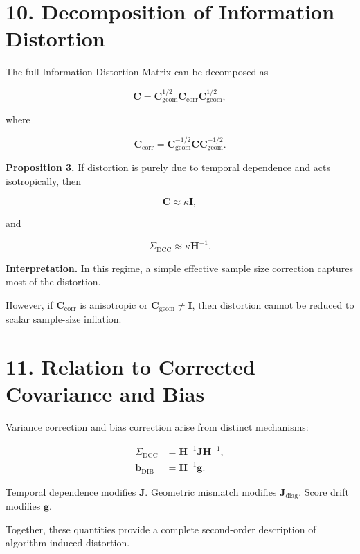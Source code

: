 \documentclass[11pt]{article}
\begin{document}
\section*{10. Decomposition of Information Distortion}

The full Information Distortion Matrix can be decomposed as

\begin{equation}
\mathbf C
=
\mathbf C_{\mathrm{geom}}^{1/2}
\mathbf C_{\mathrm{corr}}
\mathbf C_{\mathrm{geom}}^{1/2},
\end{equation}

where

\begin{equation}
\mathbf C_{\mathrm{corr}}
=
\mathbf C_{\mathrm{geom}}^{-1/2}
\mathbf C
\mathbf C_{\mathrm{geom}}^{-1/2}.
\end{equation}

\textbf{Proposition 3.}
If distortion is purely due to temporal dependence and acts isotropically,
then

\begin{equation}
\mathbf C \approx \kappa \mathbf I,
\end{equation}

and

\begin{equation}
\Sigma_{\mathrm{DCC}} \approx \kappa \mathbf H^{-1}.
\end{equation}

\textbf{Interpretation.}
In this regime, a simple effective sample size correction
captures most of the distortion.

However, if $\mathbf C_{\mathrm{corr}}$ is anisotropic
or $\mathbf C_{\mathrm{geom}} \neq \mathbf I$,
then distortion cannot be reduced to scalar sample-size inflation.

\section*{11. Relation to Corrected Covariance and Bias}

Variance correction and bias correction arise from distinct mechanisms:

\begin{align}
\Sigma_{\mathrm{DCC}} &= \mathbf H^{-1} \mathbf J \mathbf H^{-1}, \\
\mathbf b_{\mathrm{DIB}} &= \mathbf H^{-1} \mathbf g.
\end{align}

Temporal dependence modifies $\mathbf J$.
Geometric mismatch modifies $\mathbf J_{\mathrm{diag}}$.
Score drift modifies $\mathbf g$.

Together, these quantities provide a complete second-order
description of algorithm-induced distortion.
\end{document}
